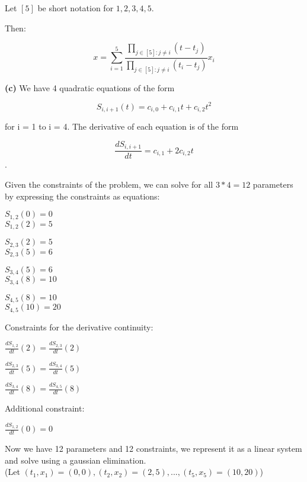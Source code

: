 \documentclass[11pt,letterpaper]{article}
\renewcommand{\part}[1] {\vspace{.10in} {\bf (#1)}}
\begin{document}
Let $[5]$ be short notation for ${1,2,3,4,5}$.

Then:

$$x = \sum_{i=1}^{5} \frac{\prod_{j \in [5] : j \neq i} (t - t_j)}{\prod_{j \in [5] : j \neq i} (t_i - t_j)} x_i$$

\part{c}
We have 4 quadratic equations of the form

$$S_{i,i+1}(t) = c_{i,0} + c_{i,1} t + c_{i,2} t^2$$

for i = 1 to i = 4. The derivative of each equation is of the form

$$\frac{dS_{i,i+1}}{dt} = c_{i,1} + 2c_{i,2} t$$.

Given the constraints of the problem, we can solve for all $3 * 4 = 12$ parameters by expressing the constraints as equations:

$S_{1,2}(0) = 0$\\
$S_{1,2}(2) = 5$

$S_{2,3}(2) = 5$\\
$S_{2,3}(5) = 6$

$S_{3,4}(5) = 6$\\
$S_{3,4}(8) = 10$

$S_{4,5}(8) = 10$\\
$S_{4,5}(10) = 20$

Constraints for the derivative continuity:

$\frac{dS_{1,2}}{dt}(2) = \frac{dS_{2,3}}{dt}(2)$

$\frac{dS_{2,3}}{dt}(5) = \frac{dS_{3,4}}{dt}(5)$

$\frac{dS_{3,4}}{dt}(8) = \frac{dS_{4,5}}{dt}(8)$

Additional constraint:

$\frac{dS_{1,2}}{dt}(0) = 0$


Now we have 12 parameters and 12 constraints, we represent it as a linear system and solve using a gaussian elimination.\\
(Let $(t_1, x_1) = (0,0), (t_2, x_2) = (2,5), ... , (t_5,x_5) = (10,20) $)
\end{document}

